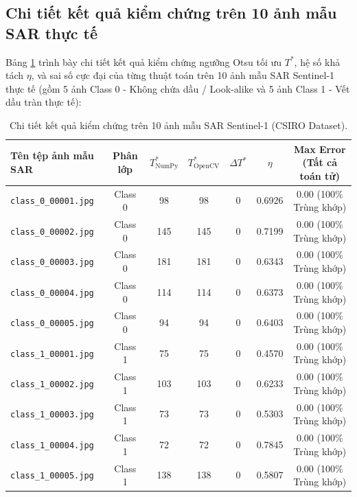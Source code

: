 \subsection{Chi tiết kết quả kiểm chứng trên 10 ảnh mẫu SAR thực tế}
\label{subsec:sar_samples_verification}
Bảng \ref{tab:sar_10_samples_verification} trình bày chi tiết kết quả kiểm chứng ngưỡng Otsu tối ưu $T^*$, hệ số khả tách $\eta$, và sai số cực đại của từng thuật toán trên 10 ảnh mẫu SAR Sentinel-1 thực tế (gồm 5 ảnh Class 0 - Không chứa dầu / Look-alike và 5 ảnh Class 1 - Vết dầu tràn thực tế):

\begin{table}[H]
\centering
\small
\caption{Chi tiết kết quả kiểm chứng trên 10 ảnh mẫu SAR Sentinel-1 (CSIRO Dataset).}
\label{tab:sar_10_samples_verification}
\begin{tabular}{lcccccc}
\toprule
\textbf{Tên tệp ảnh mẫu SAR} & \textbf{Phân lớp} & $T^*_{\text{NumPy}}$ & $T^*_{\text{OpenCV}}$ & $\Delta T^*$ & $\eta$ & \textbf{Max Error (Tất cả toán tử)} \\
\midrule
\texttt{class\_0\_00001.jpg} & Class 0 & 98  & 98  & 0 & 0.6926 & $\mathbf{0.00}$ (100\% Trùng khớp) \\
\texttt{class\_0\_00002.jpg} & Class 0 & 145 & 145 & 0 & 0.7199 & $\mathbf{0.00}$ (100\% Trùng khớp) \\
\texttt{class\_0\_00003.jpg} & Class 0 & 181 & 181 & 0 & 0.6343 & $\mathbf{0.00}$ (100\% Trùng khớp) \\
\texttt{class\_0\_00004.jpg} & Class 0 & 114 & 114 & 0 & 0.6373 & $\mathbf{0.00}$ (100\% Trùng khớp) \\
\texttt{class\_0\_00005.jpg} & Class 0 & 94  & 94  & 0 & 0.6403 & $\mathbf{0.00}$ (100\% Trùng khớp) \\
\midrule
\texttt{class\_1\_00001.jpg} & Class 1 & 75  & 75  & 0 & 0.4570 & $\mathbf{0.00}$ (100\% Trùng khớp) \\
\texttt{class\_1\_00002.jpg} & Class 1 & 103 & 103 & 0 & 0.6233 & $\mathbf{0.00}$ (100\% Trùng khớp) \\
\texttt{class\_1\_00003.jpg} & Class 1 & 73  & 73  & 0 & 0.5303 & $\mathbf{0.00}$ (100\% Trùng khớp) \\
\texttt{class\_1\_00004.jpg} & Class 1 & 72  & 72  & 0 & 0.7845 & $\mathbf{0.00}$ (100\% Trùng khớp) \\
\texttt{class\_1\_00005.jpg} & Class 1 & 138 & 138 & 0 & 0.5807 & $\mathbf{0.00}$ (100\% Trùng khớp) \\
\bottomrule
\end{tabular}
\end{table}

